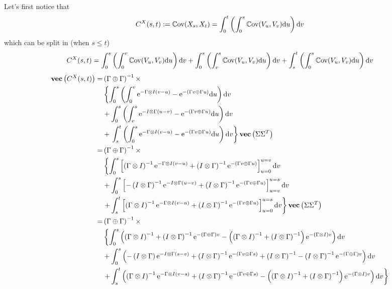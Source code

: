 Let's first notice that
$$C^X(s,t) : =  \mathbb{C}\text{ov}(X_s, X_t)  = \int_0^t \left( \int_0^s \mathbb{C}\text{ov}(V_u, V_v) \text{d} u \right) \text{d} v$$
which can be split in (when $s\leq t$)
$$C^X(s,t) = \int_0^s \left( \int_0^v \mathbb{C}\text{ov}(V_u, V_v) \text{d} u \right) \text{d} v + \int_0^s \left( \int_v^s \mathbb{C}\text{ov}(V_u, V_v) \text{d} u \right) \text{d} v + \int_s^t \left( \int_0^s \mathbb{C}\text{ov}(V_u, V_v) \text{d} u \right) \text{d} v$$
\begin{align*}
\Vect{C^X(s,t)}  =& \GpG\inv \times\\
&\left\lbrace   \int_0^s \left(\int_0^v  \e^{- \Gamma \otimes I (v - u)} - \e^{-(\Gamma v \oplus \Gamma u)} \rmd u \right) \rmd v \right. \\
& +  \int_0^s \left(\int_v^s  \e^{- I \otimes \Gamma (u - v)} - \e^{-(\Gamma v \oplus \Gamma u)} \rmd u \right) \rmd v\nonumber \\
&+ \left. \int_s^t \left(\int_0^s  \e^{- \Gamma \otimes I (v - u)} - \e^{-(\Gamma v \oplus \Gamma u)} \rmd u \right) \rmd v \right\rbrace \Vect{\Sigma\Sigma^T}\nonumber\\
=& \GpG\inv \times\\
&\left\lbrace   \int_0^s \left[  \GoI\inv \e^{- \Gamma \otimes I (v - u)} + \IoG\inv \e^{-(\Gamma v \oplus \Gamma u)} \right]_{u=0}^{u = v} \rmd v \right. \\
& +  \int_0^s \left[ - \IoG\inv  \e^{- I \otimes \Gamma (u - v)} + \IoG\inv \e^{-(\Gamma v \oplus \Gamma u)}\right]_{u = v}^{u = s} \rmd v \\
&\left. + \int_s^t \left[  \GoI\inv \e^{- \Gamma \otimes I (v - u)} + \IoG\inv \e^{-(\Gamma v \oplus \Gamma u)} \right]_{u=0}^{u = s} \rmd v \right\rbrace \Vect{\Sigma\Sigma^T}\nonumber
\\
=& \GpG\inv \times\\
&\left\lbrace   \int_0^s \left(  \GoI\inv + \IoG\inv \e^{-\GpG v} - \left(\GoI\inv + \IoG\inv\right) \e^{-\GoI v} \right) \rmd v \right. \\
&+ \int_0^s \left(  - \IoG\e^{- I \otimes \Gamma (s - v)} + \IoG\inv \e^{-(\Gamma v \oplus \Gamma s)} + \IoG \inv - \IoG\inv \e^{-\GpG v} \right) \rmd v\nonumber\\
&\left. + \int_s^t \left(  \GoI\inv \e^{- \Gamma \otimes I (v - s)} + \IoG\inv \e^{-(\Gamma v \oplus \Gamma s)} - \left(\GoI\inv + \IoG\inv\right) \e^{-\GoI v} \right) \rmd v \right\rbrace\nonumber\\

\end{align*}
